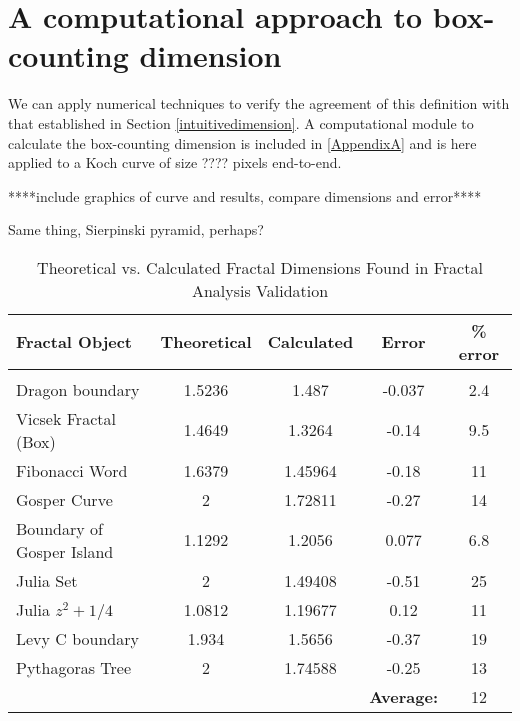 
\chapter{A computational approach to box-counting dimension} %

\label{Chapter2} %


\begin{myexample} We can apply numerical techniques to verify the agreement of this definition with that established in Section \ref{intuitivedimension}. A computational module to calculate the box-counting dimension is included in \ref{AppendixA} and is here applied to a Koch curve of size ???? pixels end-to-end. 

****include graphics of curve and results, compare dimensions and error****  \end{myexample}

\begin{myexample}Same thing, Sierpinski pyramid, perhaps?\end{myexample}


\begin{table*}
\begin{center}
\caption{Theoretical vs. Calculated Fractal Dimensions Found in Fractal Analysis Validation}\label{t:table}
\begin{tabular}{lcccc}
Fractal Object 				&	Theoretical	&	Calculated 	&	Error		&	\% error\\
\hline\\
Dragon boundary				&	1.5236					&	1.487	                &	-0.037		&	2.4	\\
Vicsek Fractal (Box)		& 	1.4649					&	1.3264					&	-0.14		&	9.5	\\
Fibonacci Word				&	1.6379					&	1.45964					&	-0.18 		&	11	\\
Gosper Curve				&	2						&	1.72811					&	-0.27		&	14				\\
Boundary of Gosper Island	&	1.1292					&	1.2056					&	0.077		&	6.8	\\
Julia Set					&	2						&	1.49408					&	-0.51		&	25	\\
Julia $z^2+1/4$				&	1.0812					&	1.19677					&	0.12		&	11	\\
Levy C boundary				&	1.934					&	1.5656					&	-0.37		&	19	\\
Pythagoras Tree				&	2						&	1.74588					&	-0.25		&	13	\\
\hline
\rule{0pt}{4ex}				&							&							& \textbf{Average: } & 12\\
\end{tabular}
\end{center}
\end{table*}
